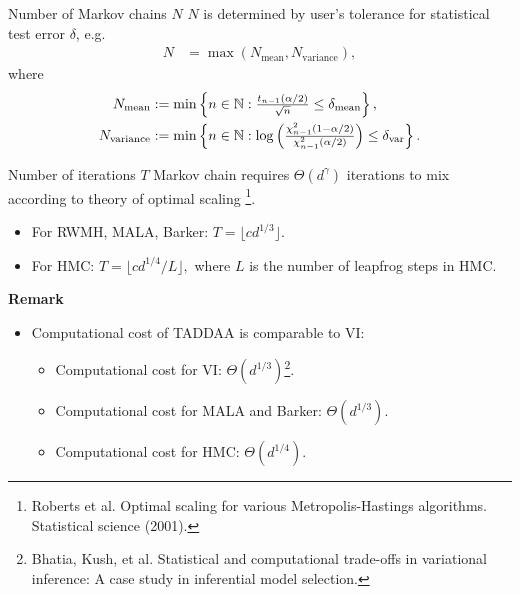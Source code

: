 \documentclass[10pt,xcolor=table]{beamer}
\begin{document}
\begin{frame}{Number of Markov chains $N$}
$N$ is determined by user's tolerance for statistical test error $\delta$, e.g.
\[
\begin{aligned}
	\label{eq:sample-size}
	\textstyle  N &= \textstyle  \max \left( N_{\text{mean}}, N_{\text{variance}}\right),
\end{aligned}
\]
where 
\[
\begin{aligned}
\textstyle N_{\text{mean}} &:= \textstyle  \min \left\{ n \in \mathbb{N} : \frac{t_{n-1}(\alpha / 2)}{\sqrt{n}} \leq \delta_{\text{mean}} \right\},  \\
\textstyle  N_{\text{variance}} &:=  \textstyle  \min \left\{ n \in \mathbb{N} :  \log\left( \frac{\chi^{2}_{n-1}(1-\alpha/2)}{\chi^{2}_{n-1}(\alpha/2)}\right) \leq \delta_{\text{var}} \right\}.
\end{aligned}
\]
\end{frame}

\begin{frame}{Number of iterations $T$}
Markov chain requires $\Theta(d^{\gamma})$ iterations to mix according to theory of optimal scaling \footnote{Roberts et al. Optimal scaling for various Metropolis-Hastings algorithms. Statistical science (2001).}. 
\begin{itemize}
    \item For RWMH, MALA, Barker: $T = \lfloor c d^{1/3} \rfloor$.
    \item For HMC: $T = \lfloor c d^{1/4}/L \rfloor, $
    where $L$ is the number of leapfrog steps in HMC. 
\end{itemize} \pause
\textbf{Remark}
\begin{itemize}
    \item Computational cost of TADDAA is comparable to VI:
    \begin{itemize}
        \item Computational cost for VI: $\Theta(d^{1/3})$\footnote{Bhatia, Kush, et al. Statistical and computational trade-offs in variational inference: A case study in inferential model selection.}.
        \item Computational cost for MALA and Barker: $\Theta(d^{1/3})$.
        \item Computational cost for HMC: $\Theta(d^{1/4})$.
    \end{itemize}
\end{itemize}
\end{frame}
\end{document}
